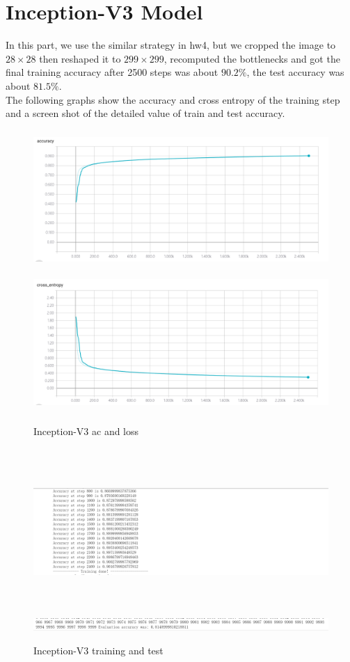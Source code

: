 \documentclass[hyperref]{article}
\theoremstyle{nonumberplain}
\begin{document}
\section{Inception-V3 Model}
In this part, we use the similar strategy in hw4, but we cropped the image to $28\times 28$ then reshaped it to $299\times299$, recomputed the bottlenecks and got the final training accuracy after 2500 steps was about $90.2\%$, the test accuracy was about $81.5\%$. \\
The following graphs show the accuracy and cross entropy of the training step and a screen shot of the detailed value of train and test accuracy.
\begin{figure}[htbp]
\centering
\includegraphics[width=440pt,height=150pt]{inceptionaccuracy.png}
\includegraphics[width=440pt,height=150pt]{inceptioncross.png}
\caption{Inception-V3 ac and loss}
\label{in-ac}
\end{figure}

\begin{figure}[htbp]
\centering
\includegraphics[height=180pt]{inceptiontrain.png}
\includegraphics[width=480pt]{inceptiontest.png}
\caption{Inception-V3 training and test}
\label{in-train}
\end{figure}
\end{document}
